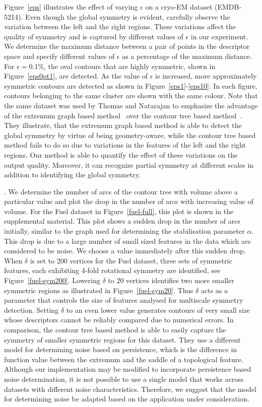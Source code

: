 \documentclass[review,journal]{vgtc}         %
\begin{document}
Figure~\ref{eps} illustrates the effect of varying $\epsilon$ on a cryo-EM dataset (EMDB-5214).
Even though the global symmetry is evident, carefully observe the variation between the left
and the right regions. These variations affect the quality of symmetry and is captured by
different values of $\epsilon$ in our experiment. We determine the maximum distance between a
pair of points in the descriptor space and specify different values of $\epsilon$ as a percentage
of the maximum distance. For $\epsilon=0.1$\%, the oval contours that are highly symmetric, shown in 
Figure~\ref{eps0pt1}, are detected. As the value of $\epsilon$ is increased, more approximately
symmetric contours are detected as shown in Figure~\ref{eps1}-\ref{eps10}. In each figure,
contours belonging to the same cluster are shown with the same colour.
Note that the same dataset was used by Thomas and Natarajan to emphasize the advantage of
the extremum graph based method~\cite{ThomN13} over the contour tree based method~\cite{ThomN11}. 
They illustrate, that the extremum graph based method is able to detect 
the global symmetry by virtue of being geometry-aware, while the contour tree based method
fails to do so due to variations in the features of the left and the right regions. Our method is able
to quantify the effect of these variations on the output quality. Moreover, it can
recognize partial symmetry at different scales in addition to identifying the global symmetry.

.
We determine the number of arcs of the contour tree with volume above a particular value and plot
the drop in the number of arcs with increasing value of volume. For the Fuel dataset in 
Figure~\ref{fuel-full}, this plot is shown in the supplemental material. This plot shows a sudden
drop in the number of arcs initially, similar to the graph used for determining the stabilisation
parameter $\alpha$. This drop is due to a large number of small sized features in the data which are 
considered to be noise.
We choose a value immediately after this sudden drop. When
$\delta$ is set to 200 vertices for the Fuel dataset, three sets of symmetric features, each exhibiting
4-fold rotational symmetry are identified, see Figure~\ref{fuel-sym200}. Lowering $\delta$ to 20 vertices
identifies two more smaller symmetric regions as illustrated in Figure~\ref{fuel-sym20}. Thus $\delta$
acts as a parameter that controls the size of features analysed for multiscale symmetry detection.
Setting $\delta$ to an even lower value generates contours of very small size whose descriptors 
cannot be reliably compared due to numerical errors. In comparison, the contour tree based 
method is able to easily capture the symmetry of smaller symmetric regions for this dataset. 
They use a different model for determining noise based on persistence, which is the difference in 
function value between the extremum and the saddle of a topological feature. 
Although our implementation may be modified to incorporate
persistence based noise determination, it is not possible to use a single model that works across
datasets with different noise characteristics. Therefore, we suggest that the model for determining noise
be adapted based on the application under consideration. 
\end{document}

